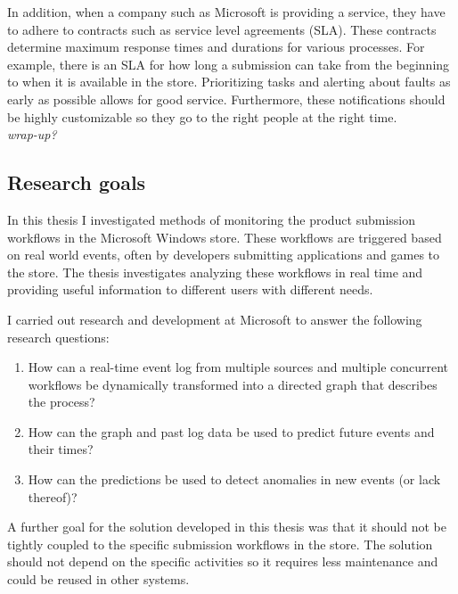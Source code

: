 \documentclass[english,12pt,a4paper,pdftex,sci,utf8]{aaltothesis}
\newcommand{\nyi}[1]{\colorbox{nyibg}{\textcolor{nyitext}{\emph{#1}}}\PackageWarning{NYI}{#1}}
\begin{document}
In addition, when a company such as Microsoft is providing a service, they have to adhere to contracts such as
service level agreements (SLA). These contracts determine maximum response times and durations for various processes.
For example, there is an SLA for how long a submission can take from the beginning to when it is available in the store.
Prioritizing tasks and alerting about faults as early as possible allows for good service. Furthermore, these
notifications should be highly customizable so they go to the right people at the right time.\\

\nyi{wrap-up?}

\subsection{Research goals}
In this thesis I investigated methods of monitoring the product submission workflows in the Microsoft Windows store.
These workflows are triggered based on real world events, often by developers submitting applications and games to the store.
The thesis investigates analyzing these workflows in real time and providing useful information to different users with different needs. 

I carried out research and development at Microsoft to answer the following research questions:

\begin{enumerate}
    \item How can a real-time event log from multiple sources and multiple concurrent workflows be dynamically transformed into a directed graph that describes the process? 
    \item How can the graph and past log data be used to predict future events and their times?
    \item How can the predictions be used to detect anomalies in new events (or lack thereof)?
\end{enumerate}

A further goal for the solution developed in this thesis was that it should not be tightly coupled to the 
specific submission workflows in the store. The solution should not depend on the specific activities so
it requires less maintenance and could be reused in other systems.
\end{document}
